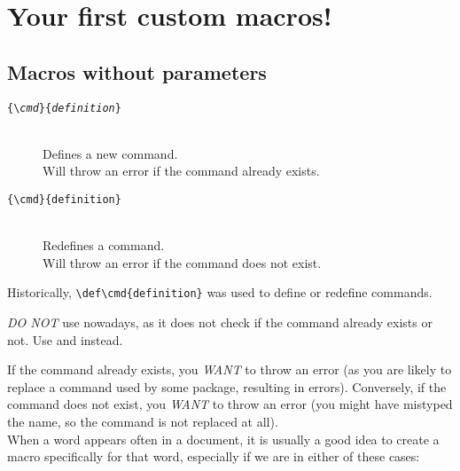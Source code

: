 \newpage

\section{Your first custom macros!} \label{first-custom-macro}


\subsection{Macros without parameters} \label{macros-without-parameters}

\begin{description}
	\item[\texttt{\{\textbackslash \emph{cmd}\}\{\emph{definition}\}}] \mbox{} \\
	Defines a new command. \\
	Will throw an error if the command already exists.
		
	\item[\texttt{\{\textbackslash cmd\}\{definition\}}] \mbox{} \\
	Redefines a command. \\
	Will throw an error if the command does not exist.
\end{description}


Historically, \lstinline|\def\cmd{definition}| was used to define or redefine commands.


\begin{note}
\emph{DO NOT} use  nowadays, as it does not check if the command already exists or not. Use  and  instead.
\end{note}

If the command already exists, you \emph{WANT}  to throw an error (as you are likely to replace a command used by some package, resulting in errors).
Conversely, if the command does not exist, you \emph{WANT}  to throw an error (you might have mistyped the name, so the command is not replaced at all).
\\




When a word appears often in a document, it is usually a good idea to create a macro specifically for that word, especially if we are in either of these cases:

